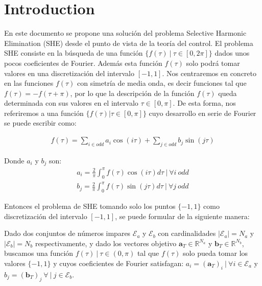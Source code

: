 \chapter{Introduction}

%
En este documento se propone una solución del problema Selective Harmonic Elimination (SHE) desde el punto de vista de la teoría del control. 
%
El problema SHE consiste en la búsqueda de una función $\{ f(\tau ) \ | \ \tau \in [0,2\pi] \}$ dados unos pocos coeficientes de Fourier. Además esta función $f(\tau)$ solo podrá tomar valores en una discretización del intervalo $[-1,1]$. Nos centraremos en concreto en las funciones $f(\tau)$ con simetría de media onda, es decir funciones tal que $f(\tau) = -f(\tau + \pi)$, por lo que la descripción de la función $f(\tau)$ queda determinada con sus valores en el intervalo $\tau \in [0,\pi]$. De esta forma, nos referiremos a una función $\{ f(\tau)  | \tau \in [0,\pi] \}$ cuyo desarrollo en serie de Fourier se puede escribir como:

\begin{gather}
    f(\tau ) = \sum_{i \in odd} a_i \cos(i\tau)+ \sum_{j \in odd}  b_j \sin(j \tau) 
\end{gather}

Donde $a_i$ y $b_j$  son:
\begin{gather}
    a_i = \frac{2}{\pi} \int_0^\pi f(\tau ) \cos(i \tau)d\tau \ | \ \forall i \ odd \label{an}\\
    b_j = \frac{2}{\pi} \int_0^\pi f(\tau)  \sin(j \tau) d\tau \ | \ \forall j \ odd \label{bn}
\end{gather}


Entonces el problema de SHE tomando solo los puntos $\{-1,1\}$ como discretización del intervalo $[-1,1]$, se puede formular de la siguiente manera:

\begin{problem}\label{SHEp}
    Dado dos conjuntos de números impares $\mathcal{E}_a$ y $\mathcal{E}_b$ con cardinalidades $|\mathcal{E}_a| = N_a$ y  $|\mathcal{E}_b| = N_b$ respectivamente, y dado los vectores objetivo $\bm{a}_T  \in \mathbb{R}^{N_a}$ y $\bm{b}_T  \in \mathbb{R}^{N_b}$, buscamos una función  $f(\tau ) \ | \ \tau \in (0,\pi)$ tal que $f(\tau)$ solo pueda tomar los valores  $\{-1,1\}$ y cuyos coeficientes de Fourier satisfagan: $ a_i = (\bm{a}_T)_i \ | \ \forall i \in \mathcal{E}_a$ y  $b_j = (\bm{b}_T)_j \ \forall \ | \  j \in \mathcal{E}_b$. 
\end{problem}


